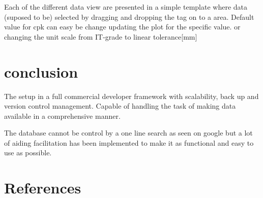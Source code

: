 \documentclass[aip,amsmath,reprint, author-year]{revtex4-1}
\begin{document}
Each of the different data view are presented in a simple template where data (suposed to be) selected by dragging and dropping the tag on to a area.
Default value for cpk can easy be change updating the plot for the specific value. or changing the unit scale from IT-grade to linear tolerance[mm]

\section{conclusion}
The setup in a full commercial developer framework with scalability, back up and version control management. Capable of handling the task of making data available in a comprehensive manner.

The database cannot be control by  a one line search as seen on google but a lot of aiding facilitation has been implemented to make it as functional and easy to use as possible.

\section*{References}

\end{document}
